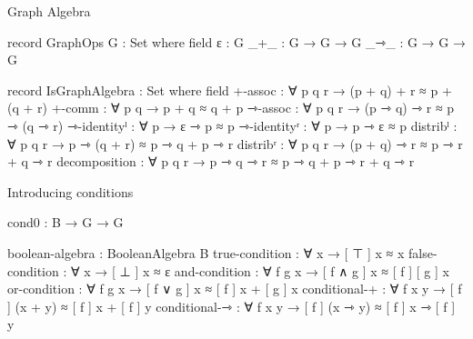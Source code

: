 \documentclass[12pt]{beamer}
\newcommand{\D}[1]{\blue{\mathsf{#1}}}
\newcommand{\seq}{\gg}
\newcommand{\hyp}{\text{-}}
\begin{document}
\begin{frame}{Graph Algebra}


\small{

\begin{code}
record GraphOps G : Set where
 field
  ε : G
  _+_ : G → G → G
  _⇾_ : G → G → G

record IsGraphAlgebra : Set where
 field
  +-assoc       : ∀ {p q r} → (p + q) + r ≈ p + (q + r)
  +-comm        : ∀ {p q}   → p + q ≈ q + p
  ⇾-assoc       : ∀ {p q r} → (p ⇾ q) ⇾ r ≈ p ⇾ (q ⇾ r)
  ⇾-identityˡ   : ∀ {p}     → ε ⇾ p ≈ p
  ⇾-identityʳ   : ∀ {p}     → p ⇾ ε ≈ p
  distribˡ      : ∀ {p q r} → p ⇾ (q + r) ≈ p ⇾ q + p ⇾ r
  distribʳ      : ∀ {p q r} → (p + q) ⇾ r ≈ p ⇾ r + q ⇾ r
  decomposition : ∀ {p q r} → p ⇾ q ⇾ r ≈ p ⇾ q + p ⇾ r + q ⇾ r
\end{code}
}
\end{frame}

\begin{frame}{Introducing conditions}
\begin{code}
  cond0 : B → G → G
\end{code}







\begin{code}
  boolean-algebra : BooleanAlgebra B
  true-condition : ∀ x → [ ⊤ ] x ≈ x
  false-condition : ∀ x → [ ⊥ ] x ≈ ε
  and-condition : ∀ f g x → [ f ∧ g ] x ≈ [ f ] [ g ]  x
  or-condition : ∀ f g x → [ f ∨ g ] x ≈ [ f ] x + [ g ]  x
  conditional-+ : ∀ f x y → [ f ] (x + y) ≈ [ f ] x + [ f ] y
  conditional-⇾ : ∀ f x y → [ f ] (x ⇾ y) ≈ [ f ] x ⇾ [ f ] y
\end{code}
\end{frame}
\end{document}
